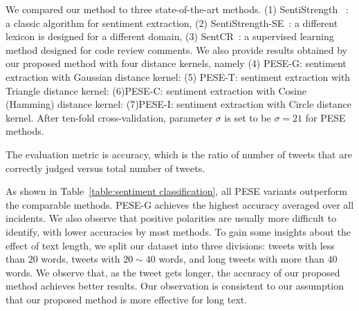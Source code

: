 \documentclass[runningheads]{llncs}
\begin{document}
We compared our method to three state-of-the-art methods. (1) SentiStrength ~\cite{sentistrength2010}: a classic algorithm for sentiment extraction, (2) SentiStrength-SE~\cite{Rakibul2017SentiStrength-SE}: a different lexicon is designed for a different domain, (3) SentCR~\cite{Ahmed2017SentiCR}:  a supervised learning method designed for code review comments. 
We also provide results obtained by our proposed method with four distance kernels, namely (4) PESE-G: sentiment extraction with Gaussian distance kernel: (5) PESE-T: sentiment extraction with Triangle distance kernel: (6)PESE-C: sentiment extraction with Cosine (Hamming) distance kernel: (7)PESE-I: sentiment extraction with Circle distance kernel. After ten-fold cross-validation, parameter $\sigma$ is set to be $\sigma=21$ for PESE methods.

The evaluation metric is accuracy, which is the ratio of number of tweets that are correctly judged versus total number of tweets.%


As shown in Table~\ref{table:sentiment classification}, all PESE variants outperform the comparable methods.
PESE-G achieves the highest accuracy averaged over all incidents. 
We also observe that positive polarities are usually more difficult to identify, with lower accuracies by most methods. To gain some insights about the effect of text length, we split our dataset into three divisions: tweets with less than $20$ words, tweets with $20\sim 40$ words, and long tweets with more than $40$ words.
We observe that, as the tweet gets longer, the accuracy of our proposed method achieves better results. Our observation is consistent to our assumption that our proposed method is more effective for long text.
\end{document}
